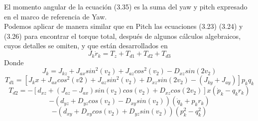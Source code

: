 El momento angular de la ecuación (3.35) es la suma del yaw y pitch expresado en el marco de
referencia de Yaw.\\
Podemos aplicar de manera similar que en Pitch las ecuaciones (3.23) (3.24) y (3.26) para
encontrar el torque total, después de algunos cálculos algebraicos, cuyos detalles se omiten,
y que están desarrollados en \cite{Paper::Yoon2001}
\begin{equation}
	J_k\dot{r}_k = T_z + T_{d1} + T_{d2} + T_{d3}
\end{equation}
Donde
\begin{equation}
	J_k = J_{kz} + J_{ax}sin^2(v_2) + J_{az}cos^2(v_2)- D_{xz}
	sin(2v_2)
\end{equation}
\begin{equation}
	T_{d1} = [J_kx + J_{ax}cos^2(v2) + J_{az}sin^2(v_2) +
			D_{xz}sin(2v_2)-(J_{ky} + J_{ay})]p_kq_k
\end{equation}
\begin{equation}
	T_{d2} = -[d_{xz} + (J_{az} - J_{ax})sin(v_2)cos(v_2)+
	D_{xz}cos(2v_2)] x (\dot{p}_k - q_kr_k)
\end{equation}
\begin{equation}\nonumber
	-(d_{yz} + D_{yz}cos(v_2) - D_{xy}sin(v_2))(\dot{q}_k + p_kr_k)
\end{equation}
\begin{equation}\nonumber
	-(d_{xy} + D_{xy}cos(v_2) + D_{yz}sin(v_2))(p^2_k - q^2_k)
\end{equation}

